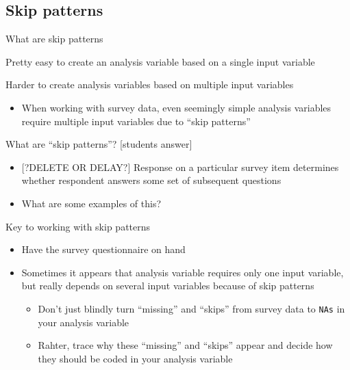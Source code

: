 \documentclass[8pt,ignorenonframetext,dvipsnames]{beamer}
\providecommand{\tightlist}{%
  \setlength{\itemsep}{0pt}\setlength{\parskip}{0pt}}
\begin{document}
\subsection{Skip patterns}\label{skip-patterns}

\begin{frame}[fragile]{What are skip patterns}

Pretty easy to create an analysis variable based on a single input
variable

Harder to create analysis variables based on multiple input variables

\begin{itemize}
\tightlist
\item
  When working with survey data, even seemingly simple analysis
  variables require multiple input variables due to ``skip patterns''
\end{itemize}

What are ``skip patterns''? {[}students answer{]}

\begin{itemize}
\tightlist
\item
  {[}?DELETE OR DELAY?{]} Response on a particular survey item
  determines whether respondent answers some set of subsequent questions
\item
  What are some examples of this?
\end{itemize}

Key to working with skip patterns

\begin{itemize}
\tightlist
\item
  Have the survey questionnaire on hand
\item
  Sometimes it appears that analysis variable requires only one input
  variable, but really depends on several input variables because of
  skip patterns

  \begin{itemize}
  \tightlist
  \item
    Don't just blindly turn ``missing'' and ``skips'' from survey data
    to \texttt{NAs} in your analysis variable
  \item
    Rahter, trace why these ``missing'' and ``skips'' appear and decide
    how they should be coded in your analysis variable
  \end{itemize}
\end{itemize}

\end{frame}
\end{document}
